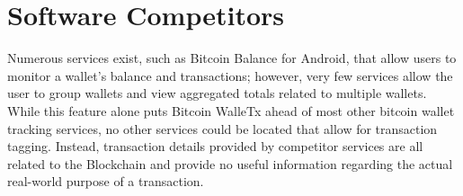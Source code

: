\documentclass[12pt]{article}
\begin{document}
  \section{Software Competitors}
  \begin{adjustwidth}{1.5em}{0pt}

  \normalsize{Numerous services exist, such as Bitcoin Balance for Android, that allow users to monitor a wallet's balance and transactions; however, very few services allow the user to
  group wallets and view aggregated totals related to multiple wallets. While this feature alone puts Bitcoin WalleTx ahead of most other bitcoin wallet tracking services, no other 
  services could be located that allow for transaction tagging. Instead, transaction details provided by competitor services are all related to the Blockchain and provide no useful 
  information regarding the actual real-world purpose of a transaction. }\\ 
  \end{adjustwidth}
\end{document}

